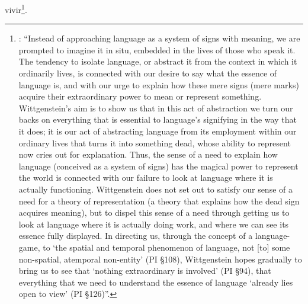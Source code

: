 vivir\footnote{\cite[Cf.][48]{mcginn2013guide}: \enquote{Instead of approaching language as a system of signs with meaning, we are prompted to imagine it in situ, embedded in the lives of those who speak it. The tendency to isolate language, or abstract it from the context in which it ordinarily lives, is connected with our desire to say what the essence of language is, and with our urge to explain how these mere signs (mere marks) acquire their extraordinary power to mean or represent something. Wittgenstein’s aim is to show us that in this act of abstraction we turn our backs on everything that is essential to language’s signifying in the way that it does; it is our act of abstracting language from its employment within our ordinary lives that turns it into something dead, whose ability to represent now cries out for explanation. Thus, the sense of a need to explain how language (conceived as a system of signs) has the magical power to represent the world is connected with our failure to look at language where it is actually functioning. Wittgenstein does not set out to satisfy our sense of a need for a theory of representation (a theory that explains how the dead sign acquires meaning), but to dispel this sense of a need through getting us to look at language where it is actually doing work, and where we can see its essence fully displayed. In directing us, through the concept of a language-game, to ‘the spatial and temporal phenomenon of language, not [to] some non-spatial, atemporal non-entity’ (PI §108), Wittgenstein hopes gradually to bring us to see that ‘nothing extraordinary is involved’ (PI §94), that everything that we need to understand the essence of language ‘already lies open to view’ (PI §126)}.}.
